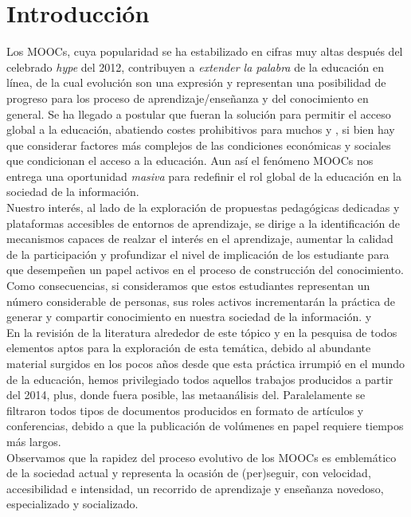\documentclass[10pt]{article}
\begin{document}
\section{Introducción}
Los MOOCs, cuya popularidad se ha estabilizado en cifras muy altas después del celebrado \textit{hype} del 2012, contribuyen a \textit {extender la palabra} de la educación en línea, de la cual evolución son una expresión y representan una posibilidad de progreso para los proceso de aprendizaje/enseñanza y del conocimiento en general. Se ha llegado a postular que fueran la solución para permitir el acceso global a la educación, abatiendo costes prohibitivos para muchos \citep{meta} y \citep{Nrb17}, si bien hay que considerar factores más complejos de las condiciones económicas y sociales que condicionan el acceso a la educación. Aun así el fenómeno MOOCs nos entrega una oportunidad \textit {masiva} para redefinir el rol global de la educación en la sociedad de la información.
\\ Nuestro interés, al lado de la exploración de propuestas pedagógicas dedicadas y plataformas accesibles de entornos de aprendizaje, se dirige a la identificación de mecanismos capaces de realzar el interés en el aprendizaje, aumentar la calidad de la participación y profundizar el nivel de implicación de los estudiante para que desempeñen un papel activos en el proceso de construcción del conocimiento.
\\Como consecuencias, si consideramos que estos estudiantes representan un número considerable de personas, sus roles activos incrementarán la práctica de generar y compartir conocimiento en nuestra sociedad de la información.\citep{Dow12} y \citep{kop11}
\\En la revisión de la literatura alrededor de este tópico y en la pesquisa de todos elementos aptos para la exploración de esta temática, debido al  abundante material surgidos en los pocos años desde que esta práctica irrumpió en el mundo de la educación, hemos privilegiado todos aquellos trabajos producidos a partir del 2014, plus, donde fuera posible, las  metaanálisis del. Paralelamente se filtraron todos tipos de documentos producidos en formato de artículos y conferencias, debido a que la publicación de volúmenes en papel requiere tiempos más largos. \\Observamos que la rapidez del proceso evolutivo de los MOOCs es emblemático de la sociedad actual y representa la ocasión de (per)seguir, con  velocidad, accesibilidad e intensidad, un recorrido de aprendizaje y enseñanza novedoso, especializado y socializado.
\end{document}
